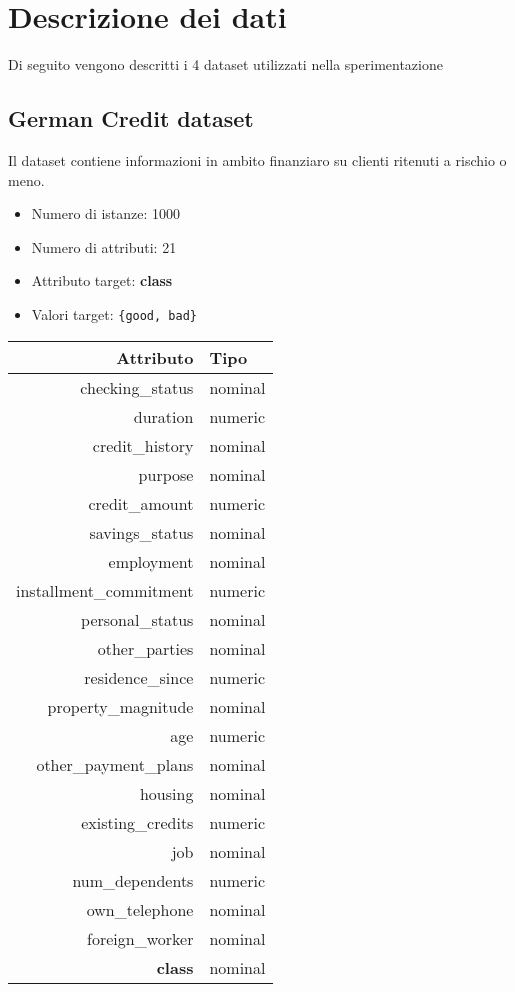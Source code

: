 \chapter{Descrizione dei dati}
\label{ch:data}

Di seguito vengono descritti i 4 dataset utilizzati nella sperimentazione

\section{German Credit dataset}
Il dataset contiene informazioni in ambito finanziaro su clienti ritenuti a rischio o meno.

\begin{itemize}
	\item Numero di istanze: 1000
	\item Numero di attributi: 21
	\item Attributo target: \textbf{class}
	\item Valori target: \texttt{\{good, bad\}}
\end{itemize}

\begin{table}[!htb]
	\centering
	\begin{tabular}{|r|l|}
		\hline
		Attributo & Tipo \\
		\hline
		checking\_status & nominal \\
		duration & numeric \\
		credit\_history & nominal \\
		purpose & nominal \\
		credit\_amount & numeric \\
		savings\_status & nominal \\
		employment & nominal \\
		installment\_commitment & numeric \\
		personal\_status & nominal \\
		other\_parties & nominal \\
		residence\_since & numeric \\
		property\_magnitude & nominal \\
		age & numeric \\
		other\_payment\_plans & nominal \\
		housing & nominal \\
		existing\_credits & numeric \\
		job & nominal \\
		num\_dependents & numeric \\
		own\_telephone & nominal \\
		foreign\_worker & nominal \\
		\textbf{class} & nominal \\
		\hline
	\end{tabular}
\end{table}

